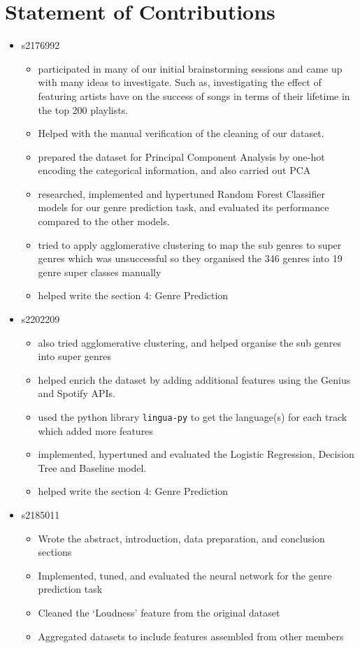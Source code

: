 \documentclass{article}
\begin{document}
\newpage
\section{Statement of Contributions}
\begin{itemize}
    \item s2176992
    \begin{itemize}
        \item participated in many of our initial brainstorming sessions and came up with many ideas to investigate. Such as, investigating the effect of featuring artists have on the success of songs in terms of their lifetime in the top 200 playlists.
        \item Helped with the manual verification of the cleaning of our dataset.
        \item prepared the dataset for Principal Component Analysis by one-hot encoding the categorical information, and also carried out PCA
        \item researched, implemented and hypertuned Random Forest Classifier models for our genre prediction task, and evaluated its performance compared to the other models. 
        \item tried to apply agglomerative clustering to map the sub genres to super genres which was unsuccessful so they organised the 346 genres into 19 genre super classes manually
        \item helped write the section 4: Genre Prediction
    \end{itemize}
    \item s2202209
    \begin{itemize}
        \item also tried agglomerative clustering, and helped organise the sub genres into super genres
        \item helped enrich the dataset by adding additional features using the Genius and Spotify APIs.
        \item used the python library \texttt{lingua-py} to get the language(s) for each track which added more features
        \item implemented, hypertuned and evaluated the Logistic Regression, Decision Tree and Baseline model.
        \item helped write the section 4: Genre Prediction
    \end{itemize}
    \item s2185011
    \begin{itemize}
        \item Wrote the abstract, introduction, data preparation, and conclusion sections
        \item Implemented, tuned, and evaluated the neural network for the genre prediction task
        \item Cleaned the `Loudness' feature from the original dataset
        \item Aggregated datasets to include features assembled from other members
        

\end{itemize}
\end{itemize}
\end{document}
